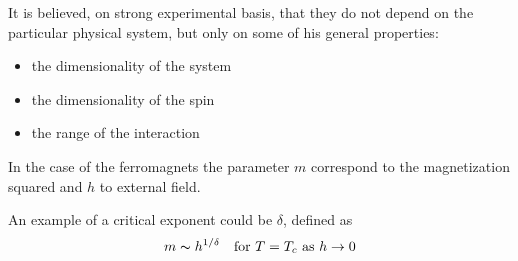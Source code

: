 \documentclass{beamer}
\begin{document}
\begin{frame}

It is believed, on strong experimental basis, that they do not depend on the
particular physical system, but only on some of his general properties:
\begin{itemize}
\item the dimensionality of the system
\item the dimensionality of the spin
\item the range of the interaction
\end{itemize}

\vspace{5mm}
In the case of the ferromagnets the parameter $m$ correspond to the magnetization
squared and $h$ to external field.

\vspace{2mm}

An example of a critical exponent could be $\delta$, defined as
\begin{equation}
m \thicksim h^{1/\delta} \quad \text{for}\ T = T_c\ \text{as}\ h \rightarrow 0
\end{equation}

\end{frame}
\end{document}
